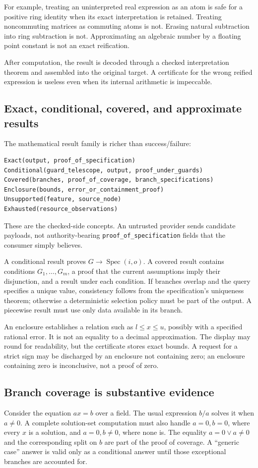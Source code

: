 \documentclass[11pt,a4paper]{article}
\newcommand{\code}[1]{\nolinkurl{#1}}
\newcommand{\Spec}{\operatorname{Spec}}
\theoremstyle{definition}
\begin{document}
For example, treating an uninterpreted real expression as an atom is safe for a
positive ring identity when its exact interpretation is retained. Treating
noncommuting matrices as commuting atoms is not. Erasing natural subtraction
into ring subtraction is not. Approximating an algebraic number by a floating
point constant is not an exact reification.

After computation, the result is decoded through a checked interpretation theorem
and assembled into the original target. A certificate for the wrong reified
expression is useless even when its internal arithmetic is impeccable.

\subsection{Exact, conditional, covered, and approximate results}
The mathematical result family is richer than success/failure:
\begin{lstlisting}
Exact(output, proof_of_specification)
Conditional(guard_telescope, output, proof_under_guards)
Covered(branches, proof_of_coverage, branch_specifications)
Enclosure(bounds, error_or_containment_proof)
Unsupported(feature, source_node)
Exhausted(resource_observations)
\end{lstlisting}
These are the checked-side concepts. An untrusted provider sends candidate
payloads, not authority-bearing \code{proof_of_specification} fields that the
consumer simply believes.

A conditional result proves \(G\to\Spec(i,o)\). A covered result contains
conditions \(G_1,\ldots,G_m\), a proof that the current assumptions imply their
disjunction, and a result under each condition. If branches overlap and the query
specifies a unique value, consistency follows from the specification's uniqueness
theorem; otherwise a deterministic selection policy must be part of the output.
A piecewise result must use only data available in its branch.

An enclosure establishes a relation such as \(l\leq x\leq u\), possibly with a
specified rational error. It is not an equality to a decimal approximation.
The display may round for readability, but the certificate stores exact bounds.
A request for a strict sign may be discharged by an enclosure not containing
zero; an enclosure containing zero is inconclusive, not a proof of zero.

\subsection{Branch coverage is substantive evidence}
Consider the equation \(ax=b\) over a field. The usual expression \(b/a\) solves
it when \(a\neq0\). A complete solution-set computation must also handle
\(a=0,b=0\), where every \(x\) is a solution, and \(a=0,b\neq0\), where none is.
The equality \(a=0\lor a\neq0\) and the corresponding split on \(b\) are part of
the proof of coverage. A ``generic case'' answer is valid only as a conditional
answer until those exceptional branches are accounted for.
\end{document}
